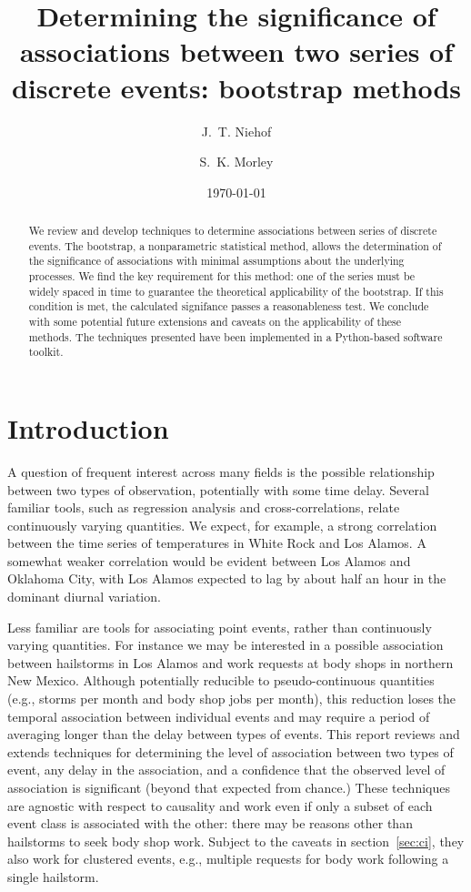 \documentclass[letterpaper,11pt]{article}
\begin{document}
\title{Determining the significance of associations between two series
of discrete events: bootstrap methods}
\author{J.~T. Niehof \and S.~K. Morley}
\date{\today}
\maketitle

\begin{abstract}
We review and develop techniques to determine associations between
series of discrete events. The bootstrap, a nonparametric statistical
method, allows the determination of the significance of associations
with minimal assumptions about the underlying processes. We find the
key requirement for this method: one of the series must be
widely spaced in time to guarantee the theoretical applicability of
the bootstrap. If this condition is met, the calculated signifance
passes a reasonableness test.  We conclude with some potential future
extensions and caveats on the applicability of these methods. The
techniques presented have been implemented in a Python-based software
toolkit.
\end{abstract}


\section{Introduction}
\label{sec:intro}
A question of frequent interest across many fields is the possible
relationship between two types of observation, potentially with some
time delay. Several familiar tools, such as regression analysis and
cross-correlations, relate continuously varying quantities. We expect,
for example, a strong correlation between the time series of
temperatures in White Rock and Los Alamos. A somewhat weaker
correlation would be evident between Los Alamos and Oklahoma
City, with Los Alamos expected to lag by about half an hour in the
dominant diurnal variation.

Less familiar are tools for associating point events, rather than
continuously varying quantities. For instance we may be interested in
a possible association between hailstorms in Los Alamos and work
requests at body shops in northern New Mexico. Although potentially
reducible to pseudo-continuous quantities (e.g., storms per month and
body shop jobs per month), this reduction loses the temporal
association between individual events and may require a period of
averaging longer than the delay between types of events. This report
reviews and extends techniques for determining the level of
association between two types of event, any delay in the association,
and a confidence that the observed level of association is significant
(beyond that expected from chance.) These techniques are agnostic
with respect to causality and work even if only a subset of each event
class is associated with the other: there may be reasons other than
hailstorms to seek body shop work. Subject to the caveats in
section~\ref{sec:ci}, they also work for clustered events,
e.g., multiple requests for body work following a single hailstorm.
\end{document}
